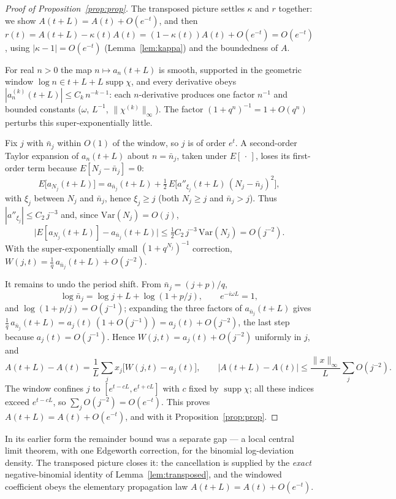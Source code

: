 \documentclass[11pt]{article}
\theoremstyle{definition}
\begin{document}
\begin{proof}[Proof of Proposition~\ref{prop:prop}]
  The transposed picture settles $\kappa$ and $r$ together: we show
  $A(t+L)=A(t)+O(e^{-t})$, and then
  $r(t)=A(t+L)-\kappa(t)A(t)=(1-\kappa(t))A(t)+O(e^{-t})=O(e^{-t})$,
  using $|\kappa-1|=O(e^{-t})$ (Lemma~\ref{lem:kappa}) and the
  boundedness of $A$.

  For real $n>0$ the map $n\mapsto a_n(t+L)$ is smooth, supported in
  the geometric window $\log n\in t+L+L\operatorname{supp}\chi$, and
  every derivative obeys $|a_n^{(k)}(t+L)|\le C_k\,n^{-k-1}$: each
  $n$-derivative produces one factor $n^{-1}$ and bounded constants
  ($\omega$, $L^{-1}$, $\|\chi^{(k)}\|_\infty$). The factor
  $(1+q^n)^{-1}=1+O(q^n)$ perturbs this super-exponentially little.

  Fix $j$ with $\bar n_j$ within $O(1)$ of the window, so $j$ is of
  order $e^{t}$. A second-order Taylor expansion of $a_n(t+L)$ about
  $n=\bar n_j$, taken under $E[\,\cdot\,]$, loses its first-order term
  because $E[N_j-\bar n_j]=0$:
  \[
    E\bigl[a_{N_j}(t+L)\bigr]=a_{\bar n_j}(t+L)
      +\tfrac12\,E\bigl[a''_{\xi_j}(t+L)\,(N_j-\bar n_j)^2\bigr],
  \]
  with $\xi_j$ between $N_j$ and $\bar n_j$, hence $\xi_j\ge j$ (both
  $N_j\ge j$ and $\bar n_j>j$). Thus $|a''_{\xi_j}|\le C_2\,j^{-3}$
  and, since $\mathrm{Var}(N_j)=O(j)$,
  \[
    \bigl|E[a_{N_j}(t+L)]-a_{\bar n_j}(t+L)\bigr|
      \le\tfrac12 C_2\,j^{-3}\,\mathrm{Var}(N_j)=O(j^{-2}).
  \]
  With the super-exponentially small $(1+q^{N_j})^{-1}$ correction,
  $W(j,t)=\tfrac1q\,a_{\bar n_j}(t+L)+O(j^{-2})$.

  It remains to undo the period shift. From $\bar n_j=(j+p)/q$,
  \[
    \log\bar n_j=\log j+L+\log(1+p/j),\qquad e^{-i\omega L}=1 ,
  \]
  and $\log(1+p/j)=O(j^{-1})$; expanding the three factors of
  $a_{\bar n_j}(t+L)$ gives
  $\tfrac1q\,a_{\bar n_j}(t+L)=a_j(t)\,(1+O(j^{-1}))=a_j(t)+O(j^{-2})$,
  the last step because $a_j(t)=O(j^{-1})$. Hence
  $W(j,t)=a_j(t)+O(j^{-2})$ uniformly in $j$, and
  \[
    A(t+L)-A(t)=\frac1L\sum_j x_j\bigl[W(j,t)-a_j(t)\bigr],
    \qquad
    |A(t+L)-A(t)|\le\frac{\|x\|_\infty}{L}\sum_j O(j^{-2}).
  \]
  The window confines $j$ to $[e^{t-cL},e^{t+cL}]$ with $c$ fixed by
  $\operatorname{supp}\chi$; all these indices exceed $e^{t-cL}$, so
  $\sum_j O(j^{-2})=O(e^{-t})$. This proves $A(t+L)=A(t)+O(e^{-t})$,
  and with it Proposition~\ref{prop:prop}.
\end{proof}

\noindent In its earlier form the remainder bound was a separate gap
--- a local central limit theorem, with one Edgeworth correction, for
the binomial log-deviation density. The transposed picture closes it:
the cancellation is supplied by the \emph{exact} negative-binomial
identity of Lemma~\ref{lem:transposed}, and the windowed coefficient
obeys the elementary propagation law $A(t+L)=A(t)+O(e^{-t})$.
\end{document}
